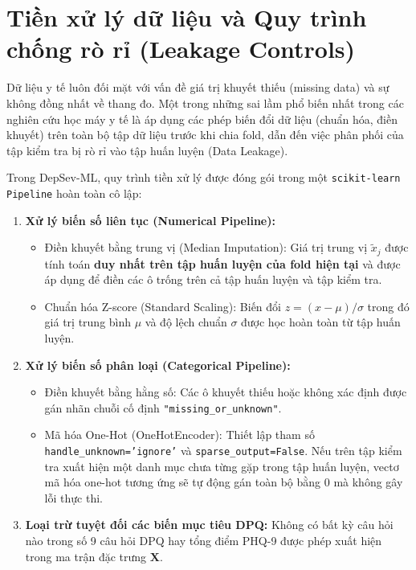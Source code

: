 

\section{Tiền xử lý dữ liệu và Quy trình chống rò rỉ (Leakage Controls)}
\label{sec:tien-xu-ly}

Dữ liệu y tế luôn đối mặt với vấn đề giá trị khuyết thiếu (missing data) và sự không đồng nhất về thang đo. Một trong những sai lầm phổ biến nhất trong các nghiên cứu học máy y tế là áp dụng các phép biến đổi dữ liệu (chuẩn hóa, điền khuyết) trên toàn bộ tập dữ liệu trước khi chia fold, dẫn đến việc phân phối của tập kiểm tra bị rò rỉ vào tập huấn luyện (Data Leakage).

Trong DepSev-ML, quy trình tiền xử lý được đóng gói trong một \texttt{scikit-learn Pipeline} hoàn toàn cô lập:
\begin{enumerate}
    \item \textbf{Xử lý biến số liên tục (Numerical Pipeline):}
    \begin{itemize}
        \item Điền khuyết bằng trung vị (Median Imputation): Giá trị trung vị $\tilde{x}_j$ được tính toán \textbf{duy nhất trên tập huấn luyện của fold hiện tại} và được áp dụng để điền các ô trống trên cả tập huấn luyện và tập kiểm tra.
        \item Chuẩn hóa Z-score (Standard Scaling): Biến đổi $z = (x - \mu) / \sigma$ trong đó giá trị trung bình $\mu$ và độ lệch chuẩn $\sigma$ được học hoàn toàn từ tập huấn luyện.
    \end{itemize}
    \item \textbf{Xử lý biến số phân loại (Categorical Pipeline):}
    \begin{itemize}
        \item Điền khuyết bằng hằng số: Các ô khuyết thiếu hoặc không xác định được gán nhãn chuỗi cố định \texttt{"missing\_or\_unknown"}.
        \item Mã hóa One-Hot (OneHotEncoder): Thiết lập tham số \texttt{handle\_unknown='ignore'} và \texttt{sparse\_output=False}. Nếu trên tập kiểm tra xuất hiện một danh mục chưa từng gặp trong tập huấn luyện, vectơ mã hóa one-hot tương ứng sẽ tự động gán toàn bộ bằng 0 mà không gây lỗi thực thi.
    \end{itemize}
    \item \textbf{Loại trừ tuyệt đối các biến mục tiêu DPQ:} Không có bất kỳ câu hỏi nào trong số 9 câu hỏi DPQ hay tổng điểm PHQ-9 được phép xuất hiện trong ma trận đặc trưng $\mathbf{X}$.
\end{enumerate}

